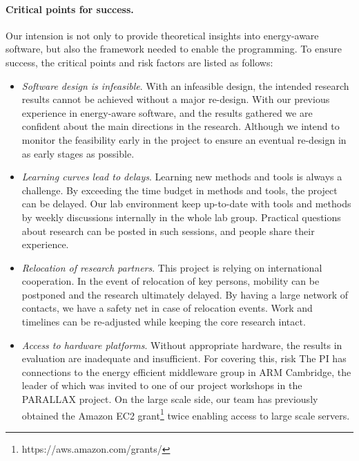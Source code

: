 \documentclass{article}
\begin{document}
\paragraph{Critical points for success. }
Our intension is not only to provide theoretical insights into energy-aware software, but also the framework needed to enable the programming.
To ensure success, the critical points and risk factors are listed as follows:
\begin{itemize}
  \item \textit{Software design is infeasible}. With an infeasible design, the intended research results cannot be achieved without a major re-design.
  With our previous experience in energy-aware software, and the results gathered we are confident about the main directions in the research. Although we intend to monitor the feasibility early in the project to ensure an eventual re-design in as early stages as possible.\vspace{-0.2cm}
  \item \textit{Learning curves lead to delays}. Learning new methods and tools is always a challenge. By exceeding the time budget in methods and tools, the project can be delayed.
  Our lab environment keep up-to-date with tools and methods by weekly discussions internally in the whole lab group. Practical questions about research can be posted in such sessions, and people share their experience.
  \vspace{-0.2cm}
 \item \textit{Relocation of research partners}. This project is relying on international cooperation. In the event of relocation of key persons, mobility can be postponed and the research ultimately delayed.
 By having a large network of contacts, we have a safety net in case of relocation events. Work and timelines can be re-adjusted while keeping the core research intact.\vspace{-0.2cm}
 \item \textit{Access to hardware platforms}. Without appropriate hardware, the results in evaluation are inadequate and insufficient.
 For covering this, risk The PI has connections to the energy efficient middleware group in ARM Cambridge, the leader of which was invited to one of our project workshops in the PARALLAX project.
 On the large scale side, our team has previously obtained the Amazon EC2 grant\footnote{https://aws.amazon.com/grants/} twice enabling access to large scale servers.
\end{itemize}
\end{document}
